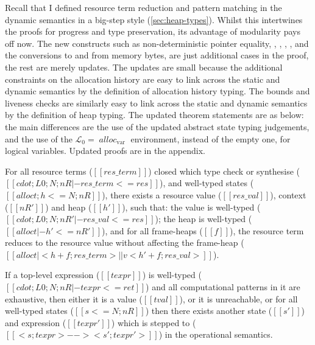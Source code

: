 Recall that I defined resource term reduction and pattern matching in the
dynamic semantics in a big-step style (\cref{sec:heap-types}). Whilst this
intertwines the proofs for progress and type preservation, its advantage of
modularity pays off now. The new constructs such as non-deterministic pointer
equality, , ,
, , and the conversions
to and from memory bytes, are just additional cases in the proof, the rest are
merely updates. The updates are small because the additional
constraints on the allocation history are easy to link across the static and
dynamic semantics by the definition of allocation history typing. The bounds
and liveness checks are similarly easy to link across the static and dynamic
semantics by the definition of heap typing. The updated theorem statements are
as below: the main differences are the use of the updated abstract state typing
judgements, and the use of the $\mathcal{L}_0 = {\; \mathit{alloc}_\mathrm{var}
\;}$ environment, instead of the empty one, for logical variables. Updated
proofs are in the appendix.

\begin{theorem}
For all resource terms ($[[ res\_term ]]$) closed which type check or synthesise
($[[ cdot ; L0 ; N ; nR |- res\_term <= res ]]$), and well-typed states
($[[ alloct ; h <= N ; nR ]]$), there exists a resource value ($[[ res\_val ]]$),
context ($[[ nR' ]]$) and heap ($[[ h' ]]$), such that: the value is well-typed
($[[ cdot ; L0 ; N ; nR' |- res\_val <= res ]]$); the heap is well-typed
($[[ alloct |- h' <= nR' ]]$), and for all frame-heaps ($[[ f ]]$), the resource term
reduces to the resource value without affecting the frame-heap
($[[ alloct | < h + f ; res\_term > ||v < h' + f ; res\_val > ]]$).
\end{theorem}

\begin{theorem}
If a top-level expression ($[[ texpr ]]$) is well-typed
($[[ cdot ; L0 ; N ; nR |- texpr <= ret ]]$) and all computational patterns
in it are exhaustive, then either it is a value ($[[ tval ]]$), or it is
unreachable, or for all well-typed states ($[[ s <= N ; nR ]]$)
then there exists another state ($[[ s' ]]$) and expression ($[[ texpr' ]]$)
which is stepped to ($[[ < s ; texpr > --> < s' ; texpr' > ]]$)
in the operational semantics.
\end{theorem}

